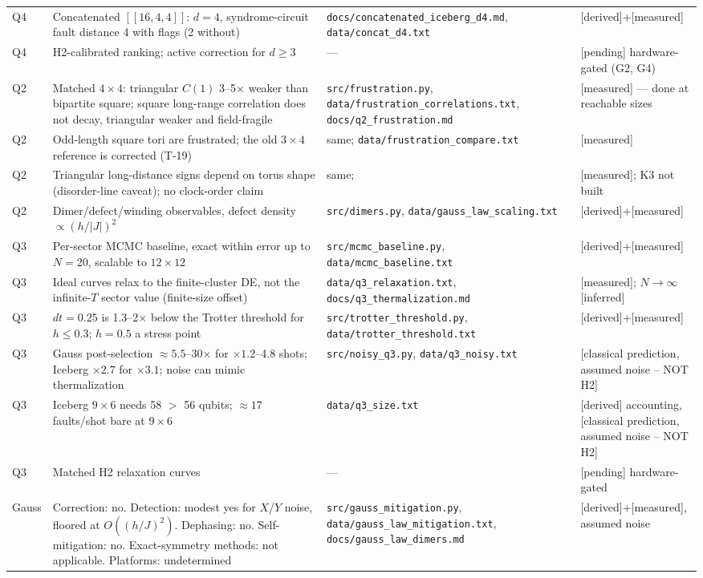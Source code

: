 \documentclass[11pt,a4paper]{article}
\newcommand{\tg}[1]{\textsf{\small[#1]}}
\newcommand{\der}{\tg{derived}}
\newcommand{\mea}{\tg{measured}}
\newcommand{\infr}{\tg{inferred}}
\newcommand{\pend}{\tg{pending}}
\newcommand{\cp}{\tg{classical prediction, assumed noise -- NOT H2}}
\newcommand{\code}[1]{\nolinkurl{#1}}
\begin{document}
\begin{longtable}{P{1.2cm}P{5.2cm}P{4.6cm}P{3.6cm}}
Q4 & Concatenated $[[16,4,4]]$: $d=4$, syndrome-circuit fault distance 4 with flags (2 without) & \code{docs/concatenated_iceberg_d4.md}, \code{data/concat_d4.txt} & \der{}+\mea\\
Q4 & H2-calibrated ranking; active correction for $d\ge3$ & --- & \pend{} hardware-gated (G2, G4)\\
\midrule
Q2 & Matched $4\times4$: triangular $C(1)$ 3--5$\times$ weaker than bipartite square; square long-range correlation does not decay, triangular weaker and field-fragile & \code{src/frustration.py}, \code{data/frustration_correlations.txt}, \code{docs/q2_frustration.md} & \mea{} --- done at reachable sizes\\
Q2 & Odd-length square tori are frustrated; the old $3\times4$ reference is corrected (T-19) & same; \code{data/frustration_compare.txt} & \mea\\
Q2 & Triangular long-distance signs depend on torus shape (disorder-line caveat); no clock-order claim & same; \cite{iglovikov} & \mea; K3 not built\\
Q2 & Dimer/defect/winding observables, defect density $\propto(h/|J|)^2$ & \code{src/dimers.py}, \code{data/gauss_law_scaling.txt} & \der{}+\mea\\
\midrule
Q3 & Per-sector MCMC baseline, exact within error up to $N=20$, scalable to $12\times12$ & \code{src/mcmc_baseline.py}, \code{data/mcmc_baseline.txt} & \der{}+\mea\\
Q3 & Ideal curves relax to the finite-cluster DE, not the infinite-$T$ sector value (finite-size offset) & \code{data/q3_relaxation.txt}, \code{docs/q3_thermalization.md} & \mea; $N\to\infty$ \infr\\
Q3 & $dt=0.25$ is 1.3--2$\times$ below the Trotter threshold for $h\le0.3$; $h=0.5$ a stress point & \code{src/trotter_threshold.py}, \code{data/trotter_threshold.txt} & \der{}+\mea\\
Q3 & Gauss post-selection $\approx5.5$--30$\times$ for $\times1.2$--4.8 shots; Iceberg $\times2.7$ for $\times3.1$; noise can mimic thermalization & \code{src/noisy_q3.py}, \code{data/q3_noisy.txt} & \cp\\
Q3 & Iceberg $9\times6$ needs 58 $>$ 56 qubits; $\approx17$ faults/shot bare at $9\times6$ & \code{data/q3_size.txt} & \der{} accounting, \cp\\
Q3 & Matched H2 relaxation curves & --- & \pend{} hardware-gated\\
\midrule
Gauss & Correction: no. Detection: modest yes for $X$/$Y$ noise, floored at $O((h/J)^2)$. Dephasing: no. Self-mitigation: no. Exact-symmetry methods: not applicable. Platforms: undetermined & \code{src/gauss_mitigation.py}, \code{data/gauss_law_mitigation.txt}, \code{docs/gauss_law_dimers.md} & \der{}+\mea, assumed noise\\
\end{longtable}
\endgroup
\end{document}
